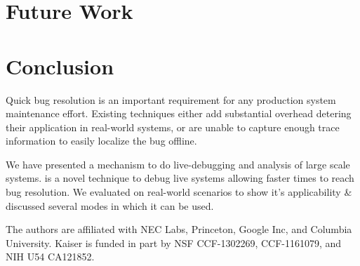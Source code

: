\section{Future Work}
\label{sec:futurework}

\section{Conclusion}
\label{sec:conclusion}

\noindent
Quick bug resolution is an important requirement for any production system maintenance effort.
Existing techniques either add substantial overhead detering their application in real-world systems, or are unable to capture enough trace information to easily localize the bug offline. 

\noindent
We have presented \parikshan a mechanism to do live-debugging and analysis of large scale systems.
\parikshan is a novel technique to debug live systems allowing faster times to reach bug resolution.
We evaluated \parikshan on real-world scenarios to show it's applicability \& discussed several modes in which it can be used.

The authors are affiliated with NEC Labs, Princeton, Google Inc, and Columbia University. 
Kaiser is funded in part by NSF CCF-1302269, CCF-1161079, and NIH U54 CA121852.
